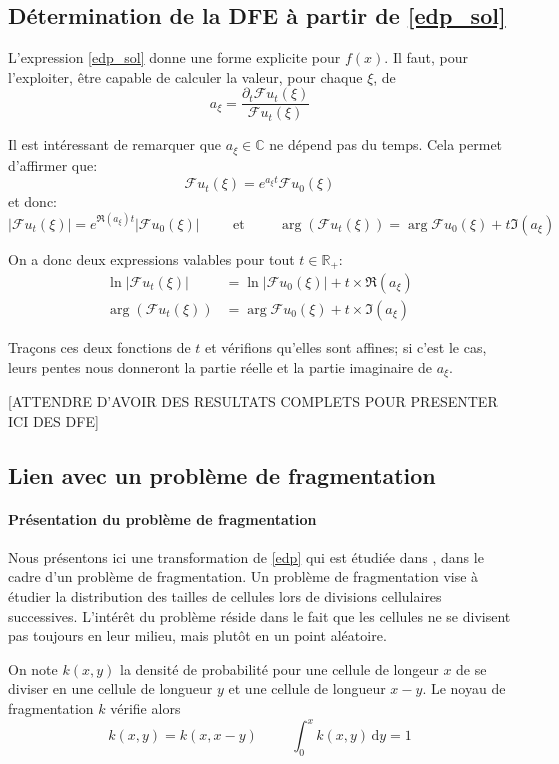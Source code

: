 \documentclass[12pt]{article}
\newcommand{\pth}[1]{\left(#1\right)}
\newcommand{\abs}[1]{\left|#1\right|}
\newcommand{\esp}{\hspace{1cm}}
\newcommand{\et}{\hspace{1cm}\text{et}\hspace{1cm}}
\newcommand{\de}{\,\mathrm{d}}
\newcommand{\Ce}{\mathbb{C}}
\newcommand{\Er}{\mathbb{R}}
\newcommand{\dr}{\partial}
\newcommand{\fr}{\mathcal{F}}
\begin{document}
\subsection{Détermination de la DFE à partir de \eqref{edp_sol}}

L'expression \eqref{edp_sol} donne une forme explicite pour $f(x)$. Il faut, pour l'exploiter, être capable de calculer la valeur, pour chaque $\xi$, de
\[a_{\xi}=\frac{\dr_t\fr u_t(\xi)}{\fr u_t(\xi)}\]

Il est intéressant de remarquer que $a_{\xi}\in\Ce$ ne dépend pas du temps. Cela permet d'affirmer que:
\[\fr u_t(\xi)=e^{a_{\xi}t}\fr u_0(\xi)\] et donc:
\[\abs{\fr u_t(\xi)}=e^{\Re(a_{\xi})t}\abs{\fr u_0(\xi)} \et \arg\pth{\fr u_t(\xi)}=\arg{\fr u_0(\xi)}+t\Im(a_{\xi})\]

On a donc deux expressions valables pour tout $t\in \Er_+$:
\begin{align*}
  \ln\abs{\fr u_t(\xi)}&=\ln\abs{\fr u_0(\xi)}+t\times\Re(a_{\xi})\\
  \arg\pth{\fr u_t(\xi)}&=\arg{\fr u_0(\xi)}+t\times\Im(a_{\xi})
\end{align*}

Traçons ces deux fonctions de $t$ et vérifions qu'elles sont affines; si c'est le cas, leurs pentes nous donneront la partie réelle et la partie imaginaire de $a_{\xi}$.

[ATTENDRE D'AVOIR DES RESULTATS COMPLETS POUR PRESENTER ICI DES DFE]

\subsection{Lien avec un problème de fragmentation}

\paragraph{Présentation du problème de fragmentation}
Nous présentons ici une transformation de \eqref{edp} qui est étudiée dans \cite{md1}, \cite{md2} dans le cadre d'un problème de fragmentation. Un problème de fragmentation vise à étudier la distribution des tailles de cellules lors de divisions cellulaires successives. L'intérêt du problème réside dans le fait que les cellules ne se divisent pas toujours en leur milieu, mais plutôt en un point aléatoire.

On note $k(x,y)$ la densité de probabilité pour une cellule de longeur $x$ de se diviser en une cellule de longueur $y$ et une cellule de longueur $x-y$. Le noyau de fragmentation $k$ vérifie alors \[k(x,y)=k(x,x-y)\esp \int_0^xk(x,y)\de y=1\]
\end{document}
